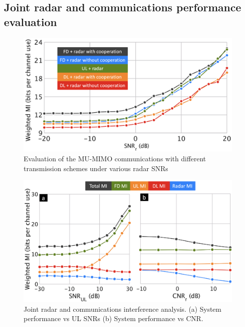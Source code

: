 \documentclass[9pt,journal]{IEEEtran}
\theoremstyle{definition}
\begin{document}
\vspace{-1em}
\subsection{Joint radar and communications performance evaluation}
\begin{figure}[t]
	\centering
	\includegraphics[width=1.0\columnwidth]{fd_vs_hd_v03.png}
	\caption{Evaluation of the MU-MIMO communications with different transmission schemes under various radar SNRs}
	\label{fig:fd_vs_hd}
	\vspace{-1em}
\end{figure}
\begin{figure}[t]
\centering
\includegraphics[width=0.9\columnwidth]{joint.png}
\caption{Joint radar and communications interference analysis. (a) System performance vs UL SNRs (b) System performance vs CNR.}
\label{fig:joint}
\vspace{-1em}
\end{figure}
\end{document}
